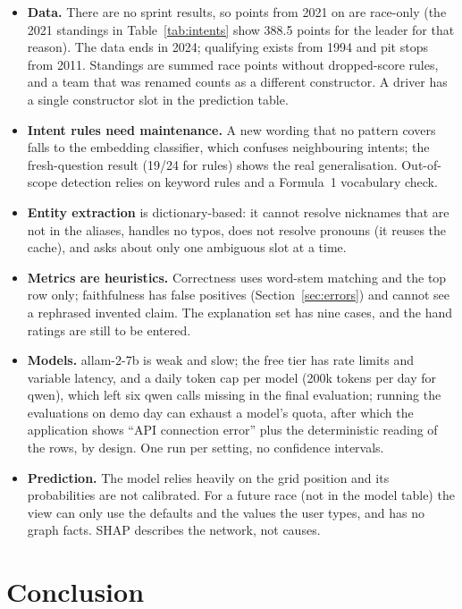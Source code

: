 \documentclass[10pt,a4paper]{article}
\begin{document}
\begin{itemize}
\item \textbf{Data.} There are no sprint results, so points from 2021 on are race-only (the 2021 standings in Table~\ref{tab:intents} show 388.5 points for the leader for that reason). The data ends in 2024; qualifying exists from 1994 and pit stops from 2011. Standings are summed race points without dropped-score rules, and a team that was renamed counts as a different constructor. A driver has a single constructor slot in the prediction table.
\item \textbf{Intent rules need maintenance.} A new wording that no pattern covers falls to the embedding classifier, which confuses neighbouring intents; the fresh-question result (19/24 for rules) shows the real generalisation. Out-of-scope detection relies on keyword rules and a Formula~1 vocabulary check.
\item \textbf{Entity extraction} is dictionary-based: it cannot resolve nicknames that are not in the aliases, handles no typos, does not resolve pronouns (it reuses the cache), and asks about only one ambiguous slot at a time.
\item \textbf{Metrics are heuristics.} Correctness uses word-stem matching and the top row only; faithfulness has false positives (Section~\ref{sec:errors}) and cannot see a rephrased invented claim. The explanation set has nine cases, and the hand ratings are still to be entered.
\item \textbf{Models.} allam-2-7b is weak and slow; the free tier has rate limits and variable latency, and a daily token cap per model (200k tokens per day for qwen), which left six qwen calls missing in the final evaluation; running the evaluations on demo day can exhaust a model's quota, after which the application shows ``API connection error'' plus the deterministic reading of the rows, by design. One run per setting, no confidence intervals.
\item \textbf{Prediction.} The model relies heavily on the grid position and its probabilities are not calibrated. For a future race (not in the model table) the view can only use the defaults and the values the user types, and has no graph facts. SHAP describes the network, not causes.
\end{itemize}

\section{Conclusion}
\end{document}
